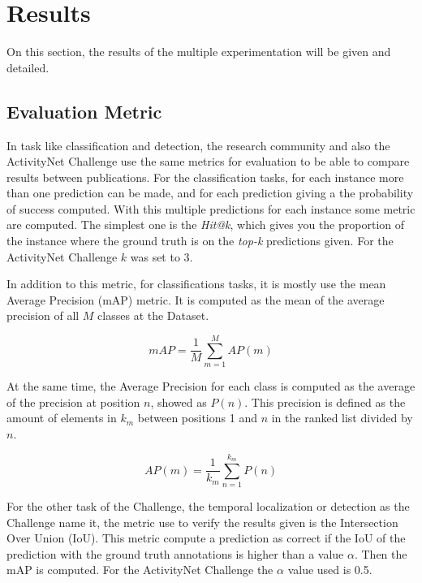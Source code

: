 \chapter{Results}
\label{section:results}

On this section, the results of the multiple experimentation will be given and detailed.

\section{Evaluation Metric}

In task like classification and detection, the research community and also the ActivityNet Challenge use the same metrics for evaluation to be able to compare results between publications. For the classification tasks, for each instance more than one prediction can be made, and for each prediction giving a the probability of success computed. With this multiple predictions for each instance some metric are computed. The simplest one is the \textit{Hit@k}, which gives you the proportion of the instance where the ground truth is on the \textit{top-k} predictions given. For the ActivityNet Challenge $k$ was set to 3.

In addition to this metric, for classifications tasks, it is mostly use the mean Average Precision (mAP) metric. It is computed as the mean of the average precision of all $M$ classes at the Dataset.

\begin{equation}
	mAP = \frac{1}{M} \sum_{m=1}^{M} AP(m)
\end{equation}

At the same time, the Average Precision for each class is computed as the average of the precision at position $n$, showed as $P(n)$. This precision is defined as the amount of elements in $k_m$ between positions 1 and $n$ in the ranked list divided by $n$.

\begin{equation}
	AP(m) = \frac{1}{k_m} \sum_{n=1}^{k_m} P(n)
\end{equation}

For the other task of the Challenge, the temporal localization or detection as the Challenge name it, the metric use to verify the results given is the Intersection Over Union (IoU). This metric compute a prediction as correct if the IoU of the prediction with the ground truth annotations is higher than a value $\alpha$. Then the mAP is computed. For the ActivityNet Challenge the $\alpha$ value used is 0.5.

